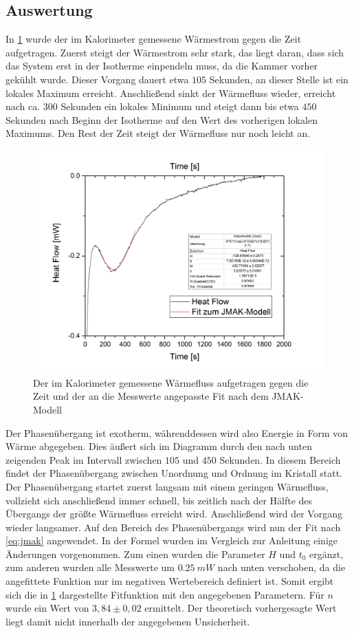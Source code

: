 \documentclass[
	a4paper,
	12pt,
	pagesize,
	ngerman
]{scrartcl}
\begin{document}
\subsection{Auswertung}
In \cref{3} wurde der im Kalorimeter gemessene Wärmestrom gegen die Zeit aufgetragen. Zuerst steigt der Wärmestrom sehr stark, das liegt daran, dass sich das System erst in der Isotherme einpendeln muss, da die Kammer vorher gekühlt wurde. Dieser Vorgang dauert etwa $105$ Sekunden, an dieser Stelle ist ein lokales Maximum erreicht. Anschließend sinkt der Wärmefluss wieder, erreicht nach ca. $300$ Sekunden ein lokales Minimum und steigt dann bis etwa $450$ Sekunden nach Beginn der Isotherme auf den Wert des vorherigen lokalen Maximums. Den Rest der Zeit steigt der Wärmefluss nur noch leicht an.

\begin{figure}[hb]
	\centering
	\includegraphics[scale=0.7]{Graph3.png}
	\caption{Der im Kalorimeter gemessene Wärmefluss aufgetragen gegen die Zeit und der an die Messwerte angepasste Fit nach dem JMAK-Modell}
	\label{3}
\end{figure}

Der Phasenübergang ist exotherm, währenddessen wird also Energie in Form von Wärme abgegeben. Dies äußert sich im Diagramm durch den nach unten zeigenden Peak im Intervall zwischen $105$ und $450$ Sekunden. In diesem Bereich findet der Phasenübergang zwischen Unordnung und Ordnung im Kristall statt. Der Phasenübergang startet zuerst langsam mit einem geringen Wärmefluss, vollzieht sich anschließend immer schnell, bis zeitlich nach der Hälfte des Übergangs der größte Wärmefluss erreicht wird. Anschließend wird der Vorgang wieder langsamer. Auf den Bereich des Phasenübergangs wird nun der Fit nach \cref{eq:jmak} angewendet. In der Formel wurden im Vergleich zur Anleitung einige Änderungen vorgenommen. Zum einen wurden die Parameter $H$ und $t_0$ ergänzt, zum anderen wurden alle Messwerte um $\SI{0,25}{mW}$ nach unten verschoben, da die angefittete Funktion nur im negativen Wertebereich definiert ist. Somit ergibt sich die in \cref{3} dargestellte Fitfunktion mit den angegebenen Parametern. Für $n$ wurde ein Wert von $3,84\pm0,02$ ermittelt. Der theoretisch vorhergesagte Wert liegt damit nicht innerhalb der angegebenen Unsicherheit.
\end{document}
